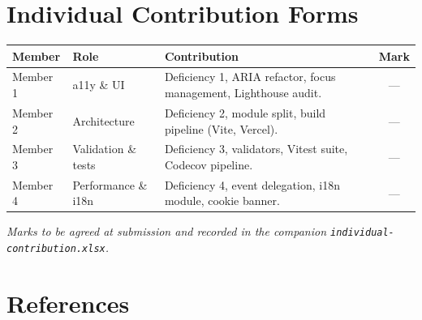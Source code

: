 \documentclass[a4paper,11pt]{article}
\begin{document}
\section{Individual Contribution Forms}

\begin{tabular}{|l|l|p{8.5cm}|c|}
\hline
\textbf{Member} & \textbf{Role} & \textbf{Contribution} & \textbf{Mark} \\ \hline
Member 1 & a11y \& UI       & Deficiency 1, ARIA refactor, focus management, Lighthouse audit. & --- \\ \hline
Member 2 & Architecture     & Deficiency 2, module split, build pipeline (Vite, Vercel).      & --- \\ \hline
Member 3 & Validation \& tests & Deficiency 3, validators, Vitest suite, Codecov pipeline.    & --- \\ \hline
Member 4 & Performance \& i18n & Deficiency 4, event delegation, i18n module, cookie banner. & --- \\ \hline
\end{tabular}

\vspace{0.5em}
\noindent\small{\textit{Marks to be agreed at submission and recorded in the
companion \texttt{individual-contribution.xlsx}.}}

\section{References}
\printbibliography[heading=none]
\end{document}

